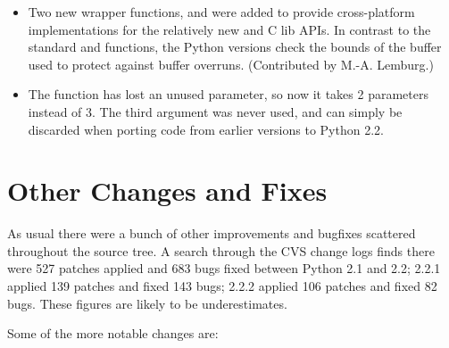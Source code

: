 \documentclass{howto}
\begin{document}
\begin{itemize}
\item
   Two new wrapper functions,  and
    were added to provide 
   cross-platform implementations for the relatively new
    and  C lib APIs. In
   contrast to the standard  and
    functions, the Python versions check the
   bounds of the buffer used to protect against buffer overruns.
   (Contributed by M.-A. Lemburg.)

   \item The  function has lost an unused
   parameter, so now it takes 2 parameters instead of 3.  The third
   argument was never used, and can simply be discarded when porting
   code from earlier versions to Python 2.2.

\end{itemize}


\section{Other Changes and Fixes}

As usual there were a bunch of other improvements and bugfixes
scattered throughout the source tree.  A search through the CVS change
logs finds there were 527 patches applied and 683 bugs fixed between
Python 2.1 and 2.2; 2.2.1 applied 139 patches and fixed 143 bugs;
2.2.2 applied 106 patches and fixed 82 bugs.  These figures are likely
to be underestimates.

Some of the more notable changes are:
\end{document}
